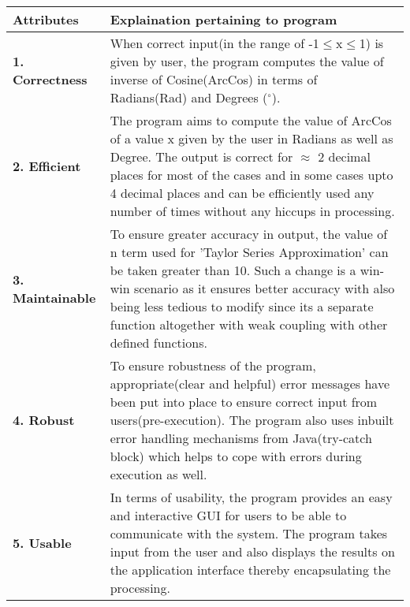 \documentclass[12pt]{report}
\begin{document}
\begin{center}
	\begin{tabular}{|p{3.5cm}|p{10cm}|}
	\hline
	Attributes&Explaination pertaining to program\\
	\hline
	\vspace{0.1cm}\textbf{1. Correctness}&\vspace{0.1cm}When correct input(in the range of -1$\leq$x$\leq$1) is given by user, the program computes the value of inverse of Cosine(ArcCos) in terms of Radians(Rad) and Degrees	($^{\circ}$).\\
	\vspace{0.1cm}\textbf{2. Efficient}&\vspace{0.1cm}The program aims to compute the value of ArcCos of a value x given by the user in Radians as well as Degree. The output is correct for $\approx$ 2 decimal places for most of the cases and in some cases upto 4 decimal places and can be efficiently used any number of times without any hiccups in processing.\\
	\vspace{0.1cm}\textbf{3. Maintainable}&\vspace{0.1cm}To ensure greater accuracy in output, the value of n term used for 'Taylor Series Approximation' can be taken greater than 10. Such a change is a win-win scenario as it ensures better accuracy with also being less tedious to modify since its a separate function altogether with weak coupling with other defined functions.\\
	\vspace{0.1cm}\textbf{4. Robust}&\vspace{0.1cm}To ensure robustness of the program, appropriate(clear and helpful) error messages have been put into place to ensure correct input from users(pre-execution). The program also uses inbuilt error handling mechanisms from Java(try-catch block) which helps to cope with errors during execution as well.\\
	\vspace{0.1cm}\textbf{5. Usable}&\vspace{0.1cm}In terms of usability, the program provides an easy and interactive GUI for users to be able to communicate with the system. The program takes input from the user and also displays the results on the application interface thereby encapsulating the processing.\\
	\hline
	\end{tabular} 
\end{center}
\pagebreak
\end{document}
